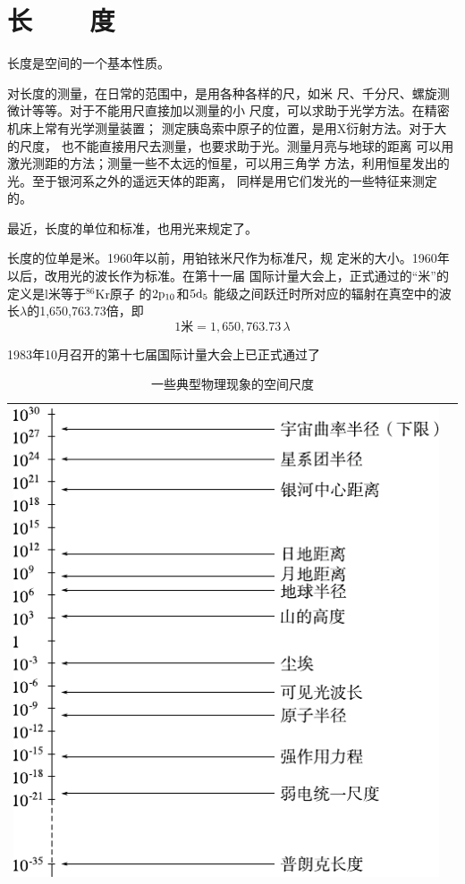 \section[长度]{长~~~~度}\label{sec:01.03}

长度是空间的一个基本性质。

对长度的测量，在日常的范围中，是用各种各样的尺，如米
尺、千分尺、螺旋测微计等等。对于不能用尺直接加以测量的小
尺度，可以求助于光学方法。在精密机床上常有光学测量装置；
测定胰岛索中原子的位置，是用X衍射方法。对于大的尺度，
也不能直接用尺去测量，也要求助于光。测量月亮与地球的距离
可以用激光测距的方法；测量一些不太远的恒星，可以用三角学
方法，利用恒星发出的光。至于银河系之外的遥远天体的距离，
同样是用它们发光的一些特征来测定的。

最近，长度的单位和标准，也用光来规定了。

长度的位单是米。1960年以前，用铂铱米尺作为标准尺，规
定米的大小。1960年以后，改用光的波长作为标准。在第十一届
国际计量大会上，正式通过的“米”的定义是l米等于$^{86}$Kr原子
\clearpage\noindent
的$2\rm{p}_{10}$和$5\rm{d}_5$
能级之间跃迁时所对应的辐射在真空中的波长$\lambda$的1,650,763.73倍，即
\begin{equation*}
  1 \text{米} = 1,650,763.73 \, \lambda
\end{equation*}


1983年10月召开的第十七届国际计量大会上已正式通过了
\begin{table}[!h]
  \centering
  \caption{一些典型物理现象的空间尺度}
  \label{tab:01.03}
  \begin{tabular*}{\linewidth}{>{\centering}m{\linewidth}c}
    \toprule
    \includegraphics[width=0.8\linewidth]{figure/tab01.03} & \\
    \bottomrule
  \end{tabular*}
\end{table}
\clearpage

